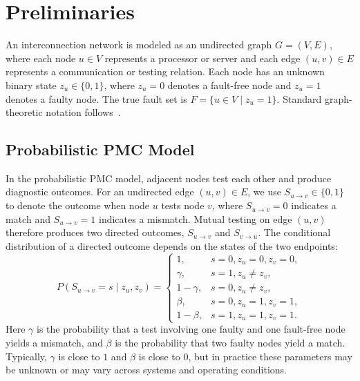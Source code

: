 \section{Preliminaries}\label{preliminaries}

An interconnection network is modeled as an undirected graph $G=(V,E)$, where each node $u\in V$ represents a processor or server and each edge $(u,v)\in E$ represents a communication or testing relation. Each node has an unknown binary state $z_u\in\{0,1\}$, where $z_u=0$ denotes a fault-free node and $z_u=1$ denotes a faulty node. The true fault set is $F=\{u\in V\mid z_u=1\}$. Standard graph-theoretic notation follows~\cite{bondy1976graph}.

\subsection{Probabilistic PMC Model}
In the probabilistic PMC model, adjacent nodes test each other and produce diagnostic outcomes. For an undirected edge $(u,v)\in E$, we use $S_{u\rightarrow v}\in\{0,1\}$ to denote the outcome when node $u$ tests node $v$, where $S_{u\rightarrow v}=0$ indicates a match and $S_{u\rightarrow v}=1$ indicates a mismatch. Mutual testing on edge $(u,v)$ therefore produces two directed outcomes, $S_{u\rightarrow v}$ and $S_{v\rightarrow u}$. The conditional distribution of a directed outcome depends on the states of the two endpoints:
\begin{equation}
P(S_{u\rightarrow v}=s\mid z_u,z_v)=
\begin{cases}
1, & s=0, z_u=0,z_v=0,\\
\gamma, & s=1, z_u\ne z_v,\\
1-\gamma, & s=0, z_u\ne z_v,\\
\beta, & s=0, z_u=1,z_v=1,\\
1-\beta, & s=1, z_u=1,z_v=1.
\end{cases}
\label{eq:prob_pmc}
\end{equation}
Here $\gamma$ is the probability that a test involving one faulty and one fault-free node yields a mismatch, and $\beta$ is the probability that two faulty nodes yield a match. Typically, $\gamma$ is close to $1$ and $\beta$ is close to $0$, but in practice these parameters may be unknown or may vary across systems and operating conditions.


